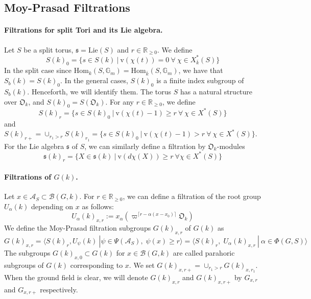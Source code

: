 \documentclass[11 pt]{article}
\numberwithin{equation}{subsection}
\theoremstyle{definition}
\theoremstyle{remark}
\theoremstyle{conjecture}
\newcommand{\rv}{\mathrm{v}}
\newcommand{\Lie}{\mathrm{Lie}}
\newcommand{\Hom}{\mathrm{Hom}}
\newcommand{\R}{\mathbb R}
\newcommand{\A}{\mathcal A}
\newcommand{\G}{\mathbb G}
\newcommand{\mf}{\mathfrak}
\newcommand{\B}{\mathcal{B}}
\begin{document}
\subsection{Moy-Prasad Filtrations}\label{section:MoyPrasadfiltrations}
\paragraph{Filtrations for split Tori and its Lie algebra.}Let $S$ be a split torus, $\mf s = \Lie(S)$ and $r \in \R_{\geq 0}$. We define 
\begin{equation*}
    S(k)_0= \{ s \in S(k)\:|\: \rv(\chi(t))=0\: \forall \: \chi \in X^*_{\bar k}(S)\}
\end{equation*}
In the split case since $\Hom_k(S,\G_m)= \Hom_{\bar k}(S,\G_m)$, we have that $S_b(k)= S(k)_0$. In the general cases, $S(k)_0$ is a finite index subgroup of $S_b(k)$. Henceforth, we will identify them. The torus $S$ has a natural structure over $\mf O_k$, and $S(k)_0= S(\mf O_k)$. For any $r \in \R_{\geq 0}$, we define 
\begin{equation*}
    S(k)_r =\{ s \in S(k)_0\:|\: \rv(\chi(t)-1)\geq r\: \forall\: \chi \in X^*(S)\} 
\end{equation*}
and $S(k)_{r+}= \cup_{r_1>r}S(k)_{r_1}= \{ s \in S(k)_0\:|\: \rv(\chi(t)-1)> r\: \forall\: \chi \in X^*(S)\}$. For the Lie algebra $\mf s$ of $S$, we can similarly define a filtration by $\mf O_k$-modules
\begin{equation*}
    \mf s(k)_r= \{ X \in \mf s(k)\:|\: \rv(d\chi(X))\geq r \:\forall \chi \in X^*(S)\}
\end{equation*}
\paragraph{Filtrations of $G(k)$.} Let $x \in \A_S \subset \B(G,k)$. For $r \in \R_{\geq 0}$, we can define a filtration of the root group $U_\alpha(k)$ depending on $x$ as follows: 
\begin{equation*}
    U_{\alpha}(k)_{x,r}:= x_\alpha (\varpi^{\lceil r-\alpha(x-x_0)\rceil}\mf O_k)
\end{equation*}
We define the Moy-Prasad filtration subgroups $G(k)_{x,r}$ of $G(k)$ as 
\begin{equation*}
    G(k)_{x,r}=\langle S(k)_r, U_{\psi}(k)\:| \psi \in \Psi(\A_S), \; \psi(x)\geq r\rangle = \langle S(k)_r,\; U_\alpha(k)_{x,r}\:|\: \alpha \in \Phi(G,S)\rangle
\end{equation*}
The subgroups $G(k)_{x,0}\subset G(k)$ for $x \in \B(G,k)$ are called parahoric subgroups of $G(k)$ corresponding to $x$. We set $G(k)_{x,r+}= \cup_{r_1>r}G(k)_{x,r_1}$. When the ground field is clear, we will denote $G(k)_{x,r}$ and $G(k)_{x,r+} $ by $G_{x,r}$ and $G_{x,r+}$ respectively.
\end{document}
